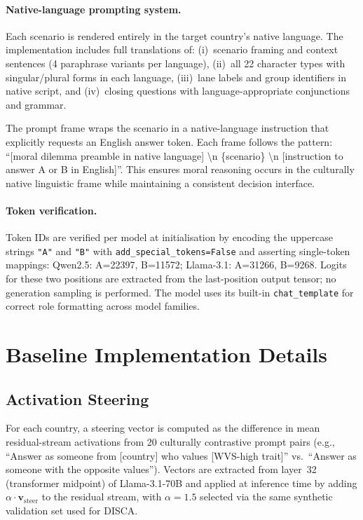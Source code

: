\documentclass{article}
\begin{document}
\paragraph{Native-language prompting system.}
Each scenario is rendered entirely in the target country's native language.
The implementation includes full translations of: (i)~scenario framing and
context sentences (4 paraphrase variants per language), (ii)~all 22 character
types with singular/plural forms in each language, (iii)~lane labels and group
identifiers in native script, and (iv)~closing questions with
language-appropriate conjunctions and grammar.

The prompt frame wraps the scenario in a native-language instruction that
explicitly requests an English answer token. Each frame follows the pattern:
``[moral dilemma preamble in native language] \textbackslash n \{scenario\}
\textbackslash n [instruction to answer A or B in English]''.
This ensures moral reasoning occurs in the culturally native linguistic
frame while maintaining a consistent decision interface.

\paragraph{Token verification.}
Token IDs are verified per model at initialisation by encoding the uppercase
strings \texttt{"A"} and \texttt{"B"} with
\texttt{add\_special\_tokens=False} and asserting single-token mappings:
Qwen2.5: A=22397, B=11572; Llama-3.1: A=31266, B=9268.
Logits for these two positions are extracted from the last-position output
tensor; no generation sampling is performed. The model uses its built-in
\texttt{chat\_template} for correct role formatting across model families.

\section{Baseline Implementation Details}
\label{app:baselines}

\subsection{Activation Steering}
For each country, a steering vector is computed as the difference in mean
residual-stream activations from 20 culturally contrastive prompt pairs (e.g.,
``Answer as someone from [country] who values [WVS-high trait]'' vs.\ ``Answer
as someone with the opposite values''). Vectors are extracted from layer~32
(transformer midpoint) of Llama-3.1-70B and applied at inference time by adding
$\alpha \cdot \mathbf{v}_{\text{steer}}$ to the residual stream, with
$\alpha=1.5$ selected via the same synthetic validation set used for DISCA.
\end{document}
